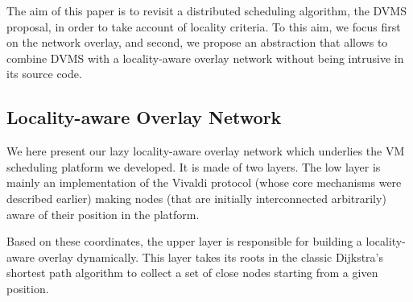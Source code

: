 The aim of this paper is to revisit a distributed scheduling algorithm, the DVMS
proposal, in order to take account of locality criteria.  To this aim, we focus
first on the network overlay, and second, we propose an abstraction that allows
to combine DVMS with a locality-aware overlay network without being intrusive in
its source code.

\subsection{Locality-aware Overlay Network \label{ssec:lao}}

We here present our lazy locality-aware overlay network which underlies the VM
scheduling platform we developed. It is made of two layers. The low layer is
mainly an implementation of the Vivaldi protocol (whose core mechanisms were
described earlier) making nodes (that are initially interconnected arbitrarily)
aware of their position in the platform.

Based on these coordinates, the upper layer is responsible for building a
locality-aware overlay dynamically. This layer takes its roots in the classic
Dijkstra's shortest path algorithm to collect a set of close nodes starting from
a given position.







